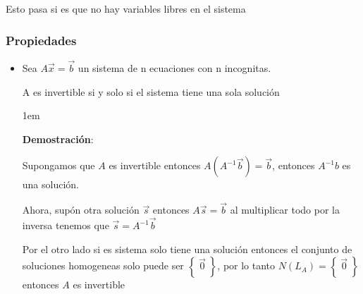 \documentclass[12pt, fleqn]{report}                             %
\newenvironment{SmallIndentation}[1][0.75em]                    %
        {\begin{adjustwidth}{#1}{}\begin{footnotesize}}             %
        {\end{footnotesize}\end{adjustwidth}}                       %
\theoremstyle{break}                                            %
\newcommand{\Set}[1]            {\left\{ \; #1 \; \right\}}     %
\begin{document}
                Esto pasa si es que no hay variables libres en el sistema


                \vspace{1em}
                \subsubsection{Propiedades}

                    \begin{itemize}
                        \item 
                            Sea $A \vec x = \vec b$ un sistema de n ecuaciones
                            con n incognitas.

                            A es invertible si y solo si el sistema tiene una
                            sola solución

                            \begin{SmallIndentation}[1em]
                                \textbf{Demostración}:
                                
                                Supongamos que $A$ es invertible entonces
                                $A(A^{-1}\vec b) = \vec b$, entonces $A^{-1}b$
                                es una solución.

                                Ahora, supón otra solución $\vec s$
                                entonces $A \vec s = \vec b$ al multiplicar
                                todo por la inversa tenemos que $\vec s = A^{-1}\vec b$

                                Por el otro lado si es sistema solo tiene una solución
                                entonces el conjunto de soluciones homogeneas solo
                                puede ser $\Set{\vec 0}$, por lo tanto $N(L_A) = \Set{\vec 0}$
                                entonces $A$ es invertible
                            
                            \end{SmallIndentation}
                                

                    \end{itemize}


            \clearpage
\end{document}
